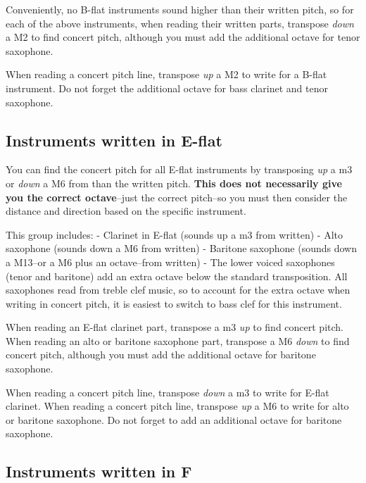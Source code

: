 \documentclass{book}
\begin{document}
Conveniently, no B-flat instruments sound higher than their written pitch, so
for each of the above instruments, when reading their written parts, transpose
\emph{down} a M2 to find concert pitch, although you must add the additional
octave for tenor saxophone.

When reading a concert pitch line, transpose \emph{up} a M2 to write for a
B-flat instrument. Do not forget the additional octave for bass clarinet and
tenor saxophone.

\hypertarget{instruments-written-in-e-flat}{%
\subsection{Instruments written in
E-flat}\label{instruments-written-in-e-flat}}

You can find the concert pitch for all E-flat instruments by transposing
\emph{up} a m3 or \emph{down} a M6 from than the written pitch. \textbf{This
does not necessarily give you the correct octave}--just the correct pitch--so
you must then consider the distance and direction based on the specific
instrument.

This group includes: - Clarinet in E-flat (sounds up a m3 from written) - Alto
saxophone (sounds down a M6 from written) - Baritone saxophone (sounds down a
M13--or a M6 plus an octave--from written) - The lower voiced saxophones
(tenor and baritone) add an extra octave below the standard transposition. All
saxophones read from treble clef music, so to account for the extra octave
when writing in concert pitch, it is easiest to switch to bass clef for this
instrument.

When reading an E-flat clarinet part, transpose a m3 \emph{up} to find concert
pitch. When reading an alto or baritone saxophone part, transpose a M6
\emph{down} to find concert pitch, although you must add the additional octave
for baritone saxophone.

When reading a concert pitch line, transpose \emph{down} a m3 to write for
E-flat clarinet. When reading a concert pitch line, transpose \emph{up} a M6
to write for alto or baritone saxophone. Do not forget to add an additional
octave for baritone saxophone.

\hypertarget{instruments-written-in-f}{%
\subsection{Instruments written in F}\label{instruments-written-in-f}}
\end{document}
